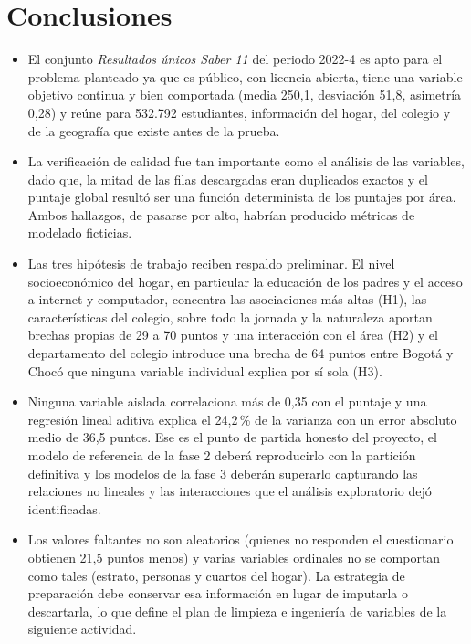 \section{Conclusiones}
    \begin{itemize}
        \item El conjunto \textit{Resultados únicos Saber 11} del periodo 2022-4
        es apto para el problema planteado ya que es público, con licencia
        abierta, tiene una variable objetivo continua y bien comportada (media
        250,1, desviación 51,8, asimetría 0,28) y reúne para 532.792
        estudiantes, información del hogar, del colegio y de la geografía que
        existe antes de la prueba.

        \item La verificación de calidad fue tan importante como el análisis de
        las variables, dado que, la mitad de las filas descargadas eran
        duplicados exactos y el puntaje global resultó ser una función
        determinista de los puntajes por área. Ambos hallazgos, de pasarse por
        alto, habrían producido métricas de modelado ficticias.

        \item Las tres hipótesis de trabajo reciben respaldo preliminar. El nivel
        socioeconómico del hogar, en particular la educación de los padres y el
        acceso a internet y computador, concentra las asociaciones más altas
        (H1), las características del colegio, sobre todo la jornada y la
        naturaleza aportan brechas propias de 29 a 70 puntos y una interacción
        con el área (H2) y el departamento del colegio introduce una brecha de
        64 puntos entre Bogotá y Chocó que ninguna variable individual explica
        por sí sola (H3).

        \item Ninguna variable aislada correlaciona más de 0,35 con el puntaje y
        una regresión lineal aditiva explica el 24,2\,\% de la varianza con un
        error absoluto medio de 36,5 puntos. Ese es el punto de partida honesto
        del proyecto, el modelo de referencia de la fase 2 deberá reproducirlo
        con la partición definitiva y los modelos de la fase 3 deberán superarlo
        capturando las relaciones no lineales y las interacciones que el
        análisis exploratorio dejó identificadas.

        \item Los valores faltantes no son aleatorios (quienes no responden el
        cuestionario obtienen 21,5 puntos menos) y varias variables ordinales no
        se comportan como tales (estrato, personas y cuartos del hogar). La
        estrategia de preparación debe conservar esa información en lugar de
        imputarla o descartarla, lo que define el plan de limpieza e ingeniería
        de variables de la siguiente actividad.
    \end{itemize}


